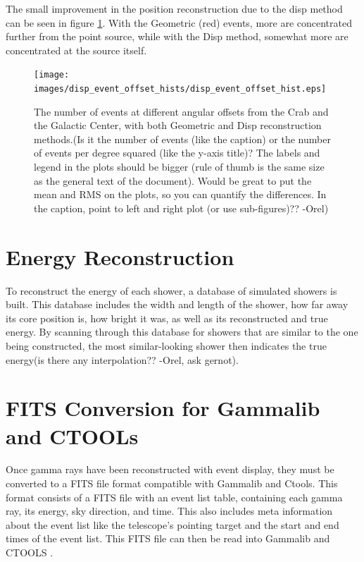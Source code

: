 The small improvement in the position reconstruction due to the disp method can be seen in figure \ref{fig:disp_event_offset}.
With the Geometric (red) events, more are concentrated further from the point source, while with the Disp method, somewhat more are concentrated at the source itself.

\begin{figure}[ht]
  \begin{center}
    \texttt{[image: images/disp\_event\_offset\_hists/disp\_event\_offset\_hist.eps]}
    \caption[DISP Offset Improvement]{The number of events at different angular offsets from the Crab and the Galactic Center, with both Geometric and Disp reconstruction methods.(Is it the number of events (like the caption) or the number of events per degree squared (like the y-axis title)? 
The labels and legend in the plots should be bigger (rule of thumb is the same size as the general text of the document). 
Would be great to put the mean and RMS on the plots, so you can quantify the differences.
In the caption, point to left and right plot (or use sub-figures)?? -Orel)}\label{fig:disp_event_offset}
  \end{center}
\end{figure}


\section{Energy Reconstruction}\label{subsec:enrecon}
To reconstruct the energy of each shower, a database of simulated showers is built.
This database includes the width and length of the shower, how far away its core position is, how bright it was, as well as its reconstructed and true energy.
By scanning through this database for showers that are similar to the one being constructed, the most similar-looking shower then indicates the true energy(is there any interpolation?? -Orel, ask gernot).


\section{FITS Conversion for Gammalib and CTOOLs}

Once gamma rays have been reconstructed with event display, they must be converted to a FITS file format compatible with Gammalib and Ctools.
This format consists of a FITS file with an event list table, containing each gamma ray, its energy, sky direction, and time.
This also includes meta information about the event list like the telescope's pointing target and the start and end times of the event list.
This FITS file can then be read into Gammalib and CTOOLS \cite{gammalibctools}.


